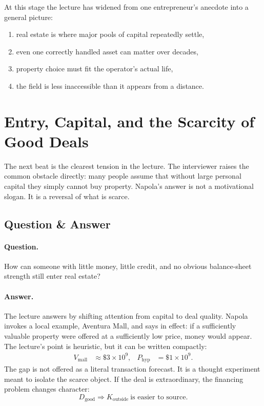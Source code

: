 At this stage the lecture has widened from one entrepreneur's anecdote into a general picture:
\begin{enumerate}
\item real estate is where major pools of capital repeatedly settle,
\item even one correctly handled asset can matter over decades,
\item property choice must fit the operator's actual life,
\item the field is less inaccessible than it appears from a distance.
\end{enumerate}

\section{Entry, Capital, and the Scarcity of Good Deals}

The next beat is the clearest tension in the lecture. The interviewer raises the common obstacle directly: many people assume that without large personal capital they simply cannot buy property. Napola's answer is not a motivational slogan. It is a reversal of what is scarce.

\subsection{Question \& Answer}

\paragraph{Question.}
How can someone with little money, little credit, and no obvious balance-sheet strength still enter real estate?

\paragraph{Answer.}
The lecture answers by shifting attention from capital to deal quality. Napola invokes a local example, Aventura Mall, and says in effect: if a sufficiently valuable property were offered at a sufficiently low price, money would appear. The lecture's point is heuristic, but it can be written compactly:
\begin{align}
V_{\text{mall}} &\approx \$3\times 10^9, &
P_{\text{hyp}} &= \$1\times 10^9.
\end{align}
The gap is not offered as a literal transaction forecast. It is a thought experiment meant to isolate the scarce object. If the deal is extraordinary, the financing problem changes character:
\begin{equation}
D_{\text{good}} \Rightarrow K_{\text{outside}}\ \text{is easier to source.}
\end{equation}

